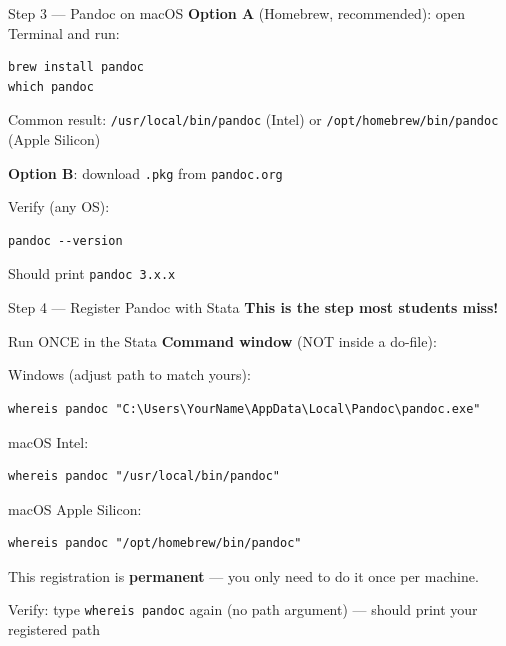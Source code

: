 \documentclass[dvipsnames,hyperref={pdfpagelabels=false}]{beamer}
\begin{document}
\begin{frame}[fragile]{Step 3 --- Pandoc on macOS}
  \textbf{Option A} (Homebrew, recommended): open Terminal and run:
  \begin{lstlisting}[language={},backgroundcolor=\color{gray!6}]
brew install pandoc
which pandoc
  \end{lstlisting}
  Common result: \texttt{/usr/local/bin/pandoc} (Intel) or
  \texttt{/opt/homebrew/bin/pandoc} (Apple Silicon)

  \vspace{0.5em}
  \textbf{Option B}: download \texttt{.pkg} from \texttt{pandoc.org}

  \vspace{0.5em}
  Verify (any OS):
  \begin{lstlisting}[language={},backgroundcolor=\color{gray!6}]
pandoc --version
  \end{lstlisting}
  Should print \texttt{pandoc 3.x.x}
\end{frame}

\begin{frame}[fragile]{Step 4 --- Register Pandoc with Stata}
  \alert{\textbf{This is the step most students miss!}}

  \vspace{0.5em}
  Run ONCE in the Stata \textbf{Command window} (NOT inside a do-file):

  \smallskip
  Windows (adjust path to match yours):
  \begin{lstlisting}
whereis pandoc "C:\Users\YourName\AppData\Local\Pandoc\pandoc.exe"
  \end{lstlisting}

  macOS Intel:
  \begin{lstlisting}
whereis pandoc "/usr/local/bin/pandoc"
  \end{lstlisting}

  macOS Apple Silicon:
  \begin{lstlisting}
whereis pandoc "/opt/homebrew/bin/pandoc"
  \end{lstlisting}

  \vspace{0.3em}
  This registration is \textbf{permanent} --- you only need to do it once per machine.

  \vspace{0.3em}
  Verify: type \texttt{whereis pandoc} again (no path argument) --- should print
  your registered path \checkmark
\end{frame}
\end{document}
